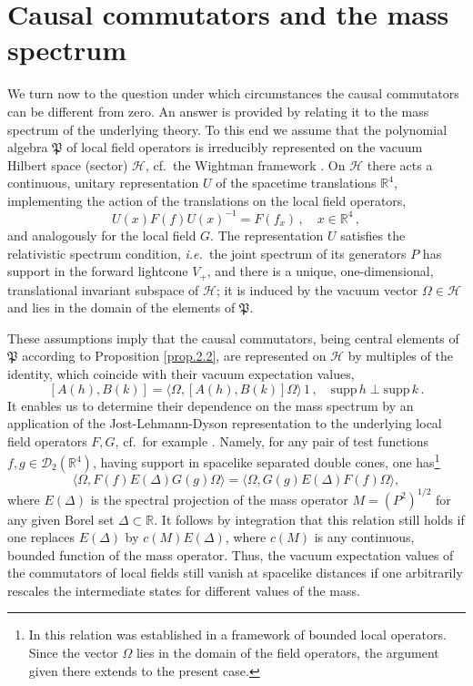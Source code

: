 \documentclass[11pt]{article}
\numberwithin{equation}{section}
\newcommand{\RR}{{\mathbb R}}
\newcommand{\Dc}{{\mathcal{D}}}
\newcommand{\Hc}{{\mathcal{H}}}
\newcommand{\fP}{{\mathfrak P}}
\newcommand{\supp}{{\mathrm{supp}}}
\def\ie{{\it i.e.\ }}
\begin{document}
\section{Causal commutators and the mass spectrum}
\label{sec4}

We turn now to the question under which 
circumstances the causal commutators can be different from zero. 
An answer is provided by relating 
it to the mass spectrum of the underlying theory. To this end 
we assume that the polynomial algebra $\fP$ of local field 
operators is irreducibly represented on the vacuum Hilbert 
space (sector) $\Hc$, cf.~the Wightman framework \cite{StWi}. 
On $\Hc$ there acts a continuous, unitary 
representation $U$ of the spacetime translations $\RR^4$, 
implementing the action of the translations on the local field operators,
$$
U(x) F(f) U(x)^{-1} = F(f_x) \, , \quad x \in \RR^4 \, ,
$$
and analogously for the local field $G$. The
representation $U$ satisfies the relativistic spectrum condition,  
\ie the joint spectrum of its generators $P$ has support in 
the forward lightcone $V_+$, and there is a unique, 
one-dimensional, translational 
invariant subspace of $\Hc$; it is induced by the vacuum vector 
$\Omega \in \Hc$ and lies in the domain of the elements of
$\fP$. 

\medskip 
These assumptions imply that the causal commutators,
being central elements of $\fP$ according to Proposition 
\ref{prop.2.2}, 
are represented on $\Hc$ by multiples of the identity, which 
coincide with their vacuum expectation values, 
$$
[A(h), B(k)] = \langle \Omega, [A(h), B(k)] \Omega \rangle \, 1 \, , 
\quad \supp \, h \perp \supp \, k \, .
$$
It enables us to determine their dependence on the
mass spectrum by an application
of the Jost-Lehmann-Dyson representation 
to the underlying local field operators $F,G$, cf.\ for example
\cite[Lem.~6.2]{DoHaRo}. Namely, 
for any pair of test functions $f,g \in \Dc_2(\RR^4)$, 
having support in spacelike separated double cones, one 
has\footnote{In \cite{DoHaRo} this relation was established in a 
framework of bounded local operators. Since the vector
$\Omega$ lies in the domain of the field operators, the argument
given there extends to the present case.}
$$
\langle \Omega, F(f) E(\Delta) G(g) \Omega \rangle 
= \langle \Omega, G(g) E(\Delta) F(f) \Omega \rangle, 
$$
where $E(\Delta)$ is the spectral projection of 
the mass operator $M = (P^2)^{1/2}$ for any given  
Borel set $\Delta \subset \RR$. It follows by 
integration that this relation still holds if 
one replaces $E(\Delta)$ by $c(M) E(\Delta)$, where $c(M)$ is any
continuous, bounded function of the mass operator. Thus, 
the vacuum expectation values of the commutators of local 
fields still vanish at spacelike distances 
if one arbitrarily rescales the 
intermediate states for different values of the mass. 
\end{document}
